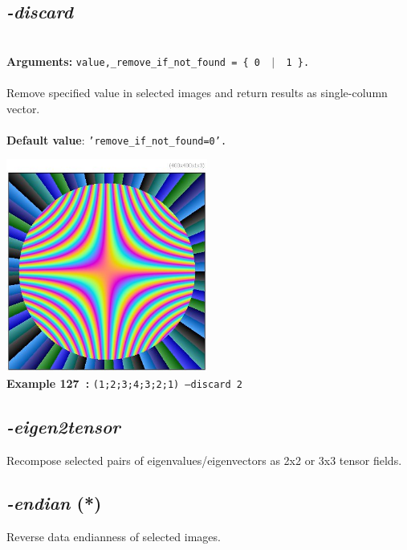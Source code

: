 \documentclass[a4paper,11pt,twoside]{book}
\begin{document}
\subsection{\emph{-discard} }\vspace*{-0.5em}
~\\\textbf{Arguments: } 
{\small \texttt{value,\_remove\_if\_not\_found = \{ 0 ~$|$~ 1 \}.}}\\~\\
Remove specified value in selected images and return results as single-column vector.
~\\~\\\textbf{Default value}: {\small \texttt{'remove\_if\_not\_found=0'.}}
\begin{center}\includegraphics[keepaspectratio=true,height=7cm,width=\textwidth]{img/gmic_def127.jpg}\\
{\footnotesize \textbf{Example 127~:} \texttt{(1;2;3;4;3;2;1) --discard 2}}
\end{center}

\subsection{\emph{-eigen2tensor} }\vspace*{-0.5em}
Recompose selected pairs of eigenvalues/eigenvectors as 2x2 or 3x3 tensor fields.


\subsection{\emph{-endian} (*)}\vspace*{-0.5em}
Reverse data endianness of selected images.
\end{document}
